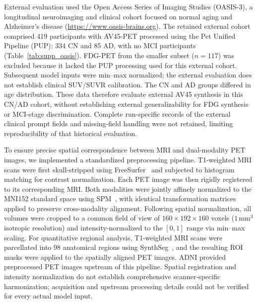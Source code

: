 \documentclass{article}
\begin{document}
External evaluation used the Open Access Series of Imaging Studies (OASIS-3), a longitudinal neuroimaging and clinical cohort focused on normal aging and Alzheimer's disease (\url{https://www.oasis-brains.org}). The retained external cohort comprised 419 participants with AV45-PET processed using the Pet Unified Pipeline (PUP): 334 CN and 85 AD, with no MCI participants (Table~\ref{tab:supp_oasis}). FDG-PET from the smaller subset ($n=117$) was excluded because it lacked the PUP processing used for this external cohort. Subsequent model inputs were min--max normalized; the external evaluation does not establish clinical SUV/SUVR calibration. The CN and AD groups differed in age distribution. These data therefore evaluate external AV45 synthesis in this CN/AD cohort, without establishing external generalizability for FDG synthesis or MCI-stage discrimination. Complete run-specific records of the external clinical prompt fields and missing-field handling were not retained, limiting reproducibility of that historical evaluation.

To ensure precise spatial correspondence between MRI and dual-modality PET images, we implemented a standardized preprocessing pipeline. T1-weighted MRI scans were first skull-stripped using FreeSurfer~\cite{Freesurfer} and subjected to histogram matching for contrast normalization. Each PET image was then rigidly registered to its corresponding MRI. Both modalities were jointly affinely normalized to the MNI152 standard space using SPM~\cite{spm,friston1995spatial}, with identical transformation matrices applied to preserve cross-modality alignment. Following spatial normalization, all volumes were cropped to a common field of view of $160 \times 192 \times 160$ voxels ($1\,\text{mm}^3$ isotropic resolution) and intensity-normalized to the $[0, 1]$ range via min–max scaling. For quantitative regional analysis, T1-weighted MRI scans were parcellated into 98 anatomical regions using SynthSeg~\cite{synthseg}, and the resulting ROI masks were applied to the spatially aligned PET images. ADNI provided preprocessed PET images upstream of this pipeline. Spatial registration and intensity normalization do not establish comprehensive scanner-specific harmonization; acquisition and upstream processing details could not be verified for every actual model input.
\end{document}

